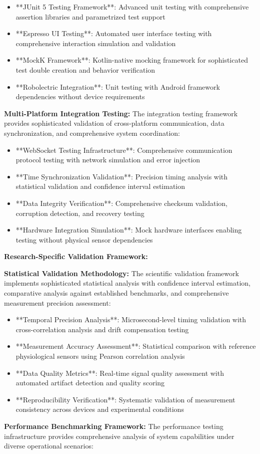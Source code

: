 \documentclass[11pt,a4paper]{report}
\begin{document}
\begin{itemize}
\item **JUnit 5 Testing Framework**: Advanced unit testing with comprehensive assertion libraries and parametrized test
  support
\item **Espresso UI Testing**: Automated user interface testing with comprehensive interaction simulation and validation
\item **MockK Framework**: Kotlin-native mocking framework for sophisticated test double creation and behavior verification
\item **Robolectric Integration**: Unit testing with Android framework dependencies without device requirements

\end{itemize}
\textbf{Multi-Platform Integration Testing:}
The integration testing framework provides sophisticated validation of cross-platform communication, data
synchronization, and comprehensive system coordination:

\begin{itemize}
\item **WebSocket Testing Infrastructure**: Comprehensive communication protocol testing with network simulation and error
  injection
\item **Time Synchronization Validation**: Precision timing analysis with statistical validation and confidence interval
  estimation
\item **Data Integrity Verification**: Comprehensive checksum validation, corruption detection, and recovery testing
\item **Hardware Integration Simulation**: Mock hardware interfaces enabling testing without physical sensor dependencies

\end{itemize}
\textbf{Research-Specific Validation Framework:}

\textbf{Statistical Validation Methodology:}
The scientific validation framework implements sophisticated statistical analysis with confidence interval estimation,
comparative analysis against established benchmarks, and comprehensive measurement precision assessment:

\begin{itemize}
\item **Temporal Precision Analysis**: Microsecond-level timing validation with cross-correlation analysis and drift
  compensation testing
\item **Measurement Accuracy Assessment**: Statistical comparison with reference physiological sensors using Pearson
  correlation analysis
\item **Data Quality Metrics**: Real-time signal quality assessment with automated artifact detection and quality scoring
\item **Reproducibility Verification**: Systematic validation of measurement consistency across devices and experimental
  conditions

\end{itemize}
\textbf{Performance Benchmarking Framework:}
The performance testing infrastructure provides comprehensive analysis of system capabilities under diverse operational
scenarios:
\end{document}
